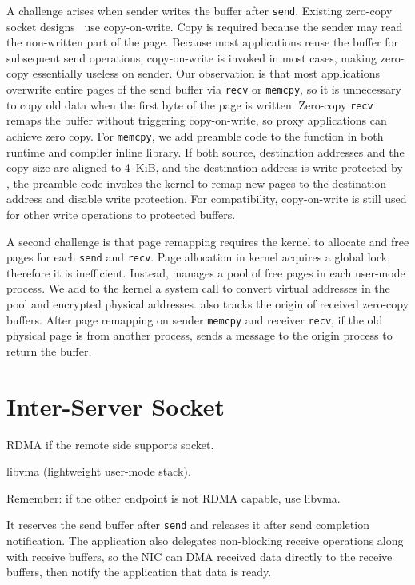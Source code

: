 A challenge arises when sender writes the buffer after \texttt{send}.
Existing zero-copy socket designs~\cite{thadani1995efficient,chu1996zero} use copy-on-write. Copy is required because the sender may read the non-written part of the page.
Because most applications reuse the buffer for subsequent send operations, copy-on-write is invoked in most cases, making zero-copy essentially useless on sender.
Our observation is that most applications overwrite entire pages of the send buffer via \texttt{recv} or \texttt{memcpy}, so it is unnecessary to copy old data when the first byte of the page is written.
Zero-copy \texttt{recv} remaps the buffer without triggering copy-on-write, so proxy applications can achieve zero copy.
For \texttt{memcpy}, we add preamble code to the function in both \libipc{} runtime and compiler inline library. If both source, destination addresses and the copy size are aligned to 4~KiB, and the destination address is write-protected by \libipc{}, the preamble code invokes the kernel to remap new pages to the destination address and disable write protection.
For compatibility, copy-on-write is still used for other write operations to protected buffers.

A second challenge is that page remapping requires the kernel to allocate and free pages for each \texttt{send} and \texttt{recv}. Page allocation in kernel acquires a global lock, therefore it is inefficient. Instead, \libipc{} manages a pool of free pages in each user-mode process.
We add to the kernel a system call to convert virtual addresses in the pool and encrypted physical addresses.
\libipc{} also tracks the origin of received zero-copy buffers.
After page remapping on sender \texttt{memcpy} and receiver \texttt{recv}, if the old physical page is from another process, \libipc{} sends a message to the origin process to return the buffer.


\section{Inter-Server Socket}
\label{sec:rdma}

RDMA if the remote side supports socket.

 libvma (lightweight user-mode stack).

Remember: if the other endpoint is not RDMA capable, use libvma.

 It reserves the send buffer after \texttt{send} and releases it after send completion notification.
The application also delegates non-blocking receive operations along with receive buffers, so the NIC can DMA received data directly to the receive buffers, then notify the application that data is ready.